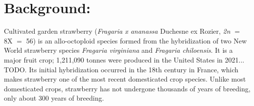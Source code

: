 \documentclass[fleqn,10pt]{olplainarticle}
\begin{document}
\flushbottom
\maketitle
\thispagestyle{empty}

\newpage




% 

\section{Background:}
Cultivated garden strawberry (\textit{Fragaria x ananassa} Duchesne ex Rozier, \textit{2n} $=$ 8X $=$ 56) is an allo-octoploid species formed from the hybridization of two New World strawberry species \textit{Fragaria virginiana} and \textit{Fragaria chiloensis}.
It is a major fruit crop; 1,211,090 tonnes were produced in the United States in 2021... TODO.
Its initial hybridization occurred in the 18th century in France, which makes strawberry one of the most recent domesticated crop species.
Unlike most domesticated crops, strawberry has not undergone thousands of years of breeding, only about 300 years of breeding. \\
\end{document}
